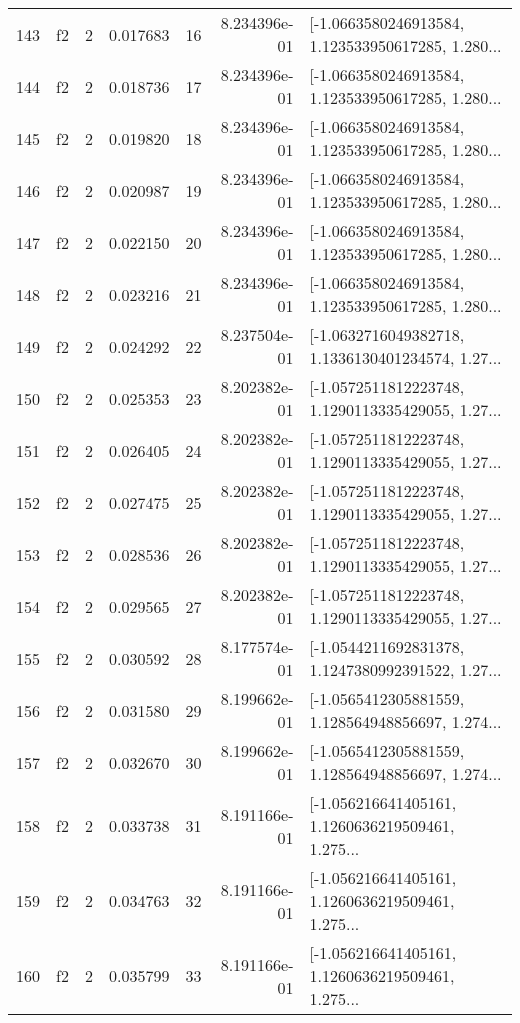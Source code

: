 \begin{tabular}{lllrlrl}
143 &  f2 &   2 &  0.017683 &   16 &  8.234396e-01 &  [-1.0663580246913584, 1.123533950617285, 1.280... \\
144 &  f2 &   2 &  0.018736 &   17 &  8.234396e-01 &  [-1.0663580246913584, 1.123533950617285, 1.280... \\
145 &  f2 &   2 &  0.019820 &   18 &  8.234396e-01 &  [-1.0663580246913584, 1.123533950617285, 1.280... \\
146 &  f2 &   2 &  0.020987 &   19 &  8.234396e-01 &  [-1.0663580246913584, 1.123533950617285, 1.280... \\
147 &  f2 &   2 &  0.022150 &   20 &  8.234396e-01 &  [-1.0663580246913584, 1.123533950617285, 1.280... \\
148 &  f2 &   2 &  0.023216 &   21 &  8.234396e-01 &  [-1.0663580246913584, 1.123533950617285, 1.280... \\
149 &  f2 &   2 &  0.024292 &   22 &  8.237504e-01 &  [-1.0632716049382718, 1.1336130401234574, 1.27... \\
150 &  f2 &   2 &  0.025353 &   23 &  8.202382e-01 &  [-1.0572511812223748, 1.1290113335429055, 1.27... \\
151 &  f2 &   2 &  0.026405 &   24 &  8.202382e-01 &  [-1.0572511812223748, 1.1290113335429055, 1.27... \\
152 &  f2 &   2 &  0.027475 &   25 &  8.202382e-01 &  [-1.0572511812223748, 1.1290113335429055, 1.27... \\
153 &  f2 &   2 &  0.028536 &   26 &  8.202382e-01 &  [-1.0572511812223748, 1.1290113335429055, 1.27... \\
154 &  f2 &   2 &  0.029565 &   27 &  8.202382e-01 &  [-1.0572511812223748, 1.1290113335429055, 1.27... \\
155 &  f2 &   2 &  0.030592 &   28 &  8.177574e-01 &  [-1.0544211692831378, 1.1247380992391522, 1.27... \\
156 &  f2 &   2 &  0.031580 &   29 &  8.199662e-01 &  [-1.0565412305881559, 1.128564948856697, 1.274... \\
157 &  f2 &   2 &  0.032670 &   30 &  8.199662e-01 &  [-1.0565412305881559, 1.128564948856697, 1.274... \\
158 &  f2 &   2 &  0.033738 &   31 &  8.191166e-01 &  [-1.056216641405161, 1.1260636219509461, 1.275... \\
159 &  f2 &   2 &  0.034763 &   32 &  8.191166e-01 &  [-1.056216641405161, 1.1260636219509461, 1.275... \\
160 &  f2 &   2 &  0.035799 &   33 &  8.191166e-01 &  [-1.056216641405161, 1.1260636219509461, 1.275... \\

\end{tabular}
